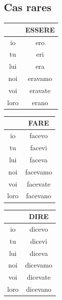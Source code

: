 \documentclass[12pt, openany]{report}
\begin{document}
\subsection{Cas rares}
\begin{minipage}{.315\textwidth}
    \begin{center}
        \begin{tabular}{c||c}
            & ESSERE \\ \hline
            io & ero \\
            tu & eri \\
            lui & era \\
            noi & eravamo \\
            voi & eravate \\
            loro & erano \\
        \end{tabular}
    \end{center}
\end{minipage}
\begin{minipage}{.315\textwidth}
    \begin{center}
        \begin{tabular}{c||c}
            & FARE \\ \hline
            io & facevo \\
            tu & facevi \\
            lui & faceva \\
            noi & facevamo\\
            voi & facevate\\
            loro & facevano \\
        \end{tabular}
    \end{center}
\end{minipage}
\begin{minipage}{.315\textwidth}
    \begin{center}
        \begin{tabular}{c||c}
            & DIRE \\ \hline
            io & dicevo \\
            tu & dicevi \\
            lui & diceva \\
            noi & dicevamo\\
            voi & dicevate \\
            loro & dicevano\\
        \end{tabular}
    \end{center}
\end{minipage}
\end{document}
